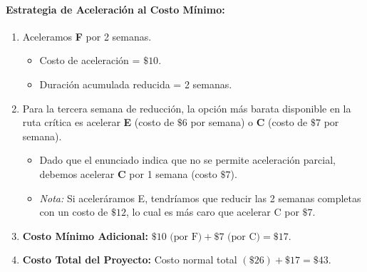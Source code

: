 \documentclass[
]{article}
\providecommand{\tightlist}{%
  \setlength{\itemsep}{0pt}\setlength{\parskip}{0pt}}
\begin{document}
\hypertarget{estrategia-de-aceleraciuxf3n-al-costo-muxednimo}{%
\paragraph{Estrategia de Aceleración al Costo
Mínimo:}\label{estrategia-de-aceleraciuxf3n-al-costo-muxednimo}}

\begin{enumerate}
\def\labelenumi{\arabic{enumi}.}
\tightlist
\item
  Aceleramos \textbf{F} por 2 semanas.

  \begin{itemize}
  \tightlist
  \item
    Costo de aceleración = \(\$10\).
  \item
    Duración acumulada reducida = 2 semanas.
  \end{itemize}
\item
  Para la tercera semana de reducción, la opción más barata disponible
  en la ruta crítica es acelerar \textbf{E} (costo de \(\$6\) por
  semana) o \textbf{C} (costo de \(\$7\) por semana).

  \begin{itemize}
  \tightlist
  \item
    Dado que el enunciado indica que no se permite aceleración parcial,
    debemos acelerar \textbf{C} por 1 semana (costo \(\$7\)).
  \item
    \emph{Nota:} Si aceleráramos E, tendríamos que reducir las 2 semanas
    completas con un costo de \(\$12\), lo cual es más caro que acelerar
    C por \(\$7\).
  \end{itemize}
\item
  \textbf{Costo Mínimo Adicional:}
  \(\$10 \text{ (por F)} + \$7 \text{ (por C)} = \$17\).
\item
  \textbf{Costo Total del Proyecto:} Costo normal total
  \((\$26) + \$17 = \$43\).
\end{enumerate}
\end{document}
